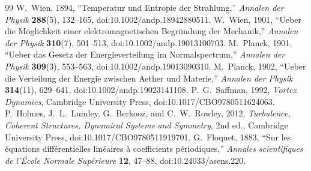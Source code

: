 \begin{thebibliography}{99}
 W.~Wien, 1894, ``Temperatur und Entropie der Strahlung,'' \textit{Annalen der Physik} \textbf{288}(5), 132--165, doi:10.1002/andp.18942880511.
 W.~Wien, 1901, ``Ueber die Möglichkeit einer elektromagnetischen Begründung der Mechanik,'' \textit{Annalen der Physik} \textbf{310}(7), 501--513, doi:10.1002/andp.19013100703.
 M.~Planck, 1901, ``Ueber das Gesetz der Energieverteilung im Normalspectrum,'' \textit{Annalen der Physik} \textbf{309}(3), 553--563, doi:10.1002/andp.19013090310.
 M.~Planck, 1902, ``Ueber die Verteilung der Energie zwischen Aether und Materie,'' \textit{Annalen der Physik} \textbf{314}(11), 629--641, doi:10.1002/andp.19023141108.
 P.~G.~Saffman, 1992, \textit{Vortex Dynamics}, Cambridge University Press, doi:10.1017/CBO9780511624063.
 P.~Holmes, J.~L.~Lumley, G.~Berkooz, and C.~W.~Rowley, 2012, \textit{Turbulence, Coherent Structures, Dynamical Systems and Symmetry}, 2nd ed., Cambridge University Press, doi:10.1017/CBO9780511919701.
 G.~Floquet, 1883, ``Sur les équations différentielles linéaires à coefficients périodiques,'' \textit{Annales scientifiques de l'École Normale Supérieure} \textbf{12}, 47--88, doi:10.24033/asens.220.
\end{thebibliography}
